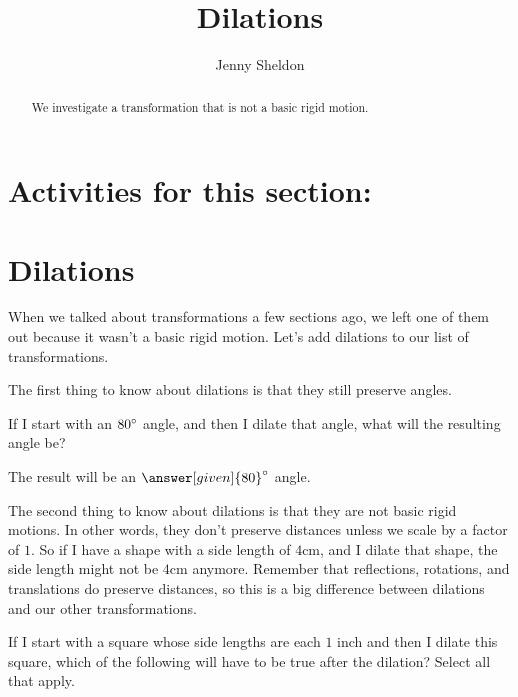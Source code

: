 \documentclass{ximera}
\title{Dilations}
\author{Jenny Sheldon}
\begin{document}
\begin{abstract}
We investigate a transformation that is not a basic rigid motion.
\end{abstract}
\maketitle

\section{Activities for this section:} 

\section{Dilations}

When we talked about transformations a few sections ago, we left one of them out because it wasn't a basic rigid motion. Let's add dilations to our list of transformations.

The first thing to know about dilations is that they still preserve angles. 
\begin{question}
If I start with an $80\degree$ angle, and then I dilate that angle, what will the resulting angle be?

\begin{prompt}
The result will be an $\answer[given]{80}\degree$ angle. 
 \end{prompt}
\end{question}

The second thing to know about dilations is that they are not basic rigid motions. In other words, they don't preserve distances unless we scale by a factor of $1$. So if I have a shape with a side length of $4$cm, and I dilate that shape, the side length might not be $4$cm anymore. Remember that reflections, rotations, and translations do preserve distances, so this is a big difference between dilations and our other transformations. 

\begin{question}
If I start with a square whose side lengths are each $1$ inch and then I dilate this square, which of the following will have to be true after the dilation? Select all that apply.
\begin{selectAll}
\end{selectAll}
\end{question}
\end{document}
